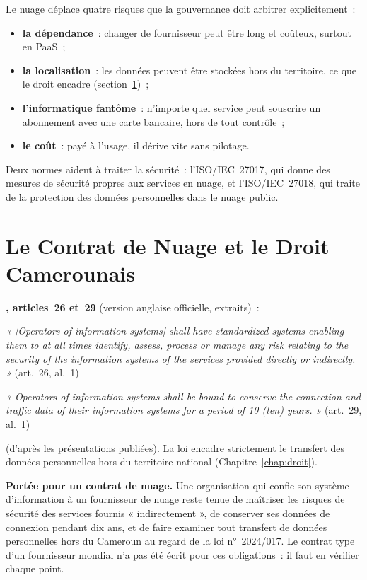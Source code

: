 Le nuage déplace quatre risques que la gouvernance doit arbitrer
explicitement~:
\begin{itemize}
    \item \textbf{la dépendance}~: changer de fournisseur peut être long et
          coûteux, surtout en PaaS~;
    \item \textbf{la localisation}~: les données peuvent être stockées
          hors du territoire, ce que le droit encadre
          (section~\ref{sec:c18-contrat})~;
    \item \textbf{l'informatique fantôme}~: n'importe quel service peut
          souscrire un abonnement avec une carte bancaire, hors de tout
          contrôle~;
    \item \textbf{le coût}~: payé à l'usage, il dérive vite sans pilotage.
\end{itemize}
Deux normes aident à traiter la sécurité~: l'ISO/IEC~27017, qui donne des
mesures de sécurité propres aux services en nuage, et l'ISO/IEC~27018, qui
traite de la protection des données personnelles dans le nuage public.

\section{Le Contrat de Nuage et le Droit Camerounais}
\label{sec:c18-contrat}

\begin{boxjuris}
\textbf{, articles~26 et~29} (version anglaise
officielle, extraits)~:

\medskip
\textit{« [Operators of information systems] shall have standardized
systems enabling them to at all times identify, assess, process or manage
any risk relating to the security of the information systems of the
services provided directly or indirectly. »} (art.~26, al.~1)

\medskip
\textit{« Operators of information systems shall be bound to conserve the
connection and traffic data of their information systems for a period of
10 (ten) years. »} (art.~29, al.~1)

\medskip
\textbf{} (d'après les présentations publiées). La loi
encadre strictement le transfert des données personnelles hors du
territoire national (Chapitre~\ref{chap:droit}).

\medskip
\textbf{Portée pour un contrat de nuage.} Une organisation qui confie son
système d'information à un fournisseur de nuage reste tenue de maîtriser
les risques de sécurité des services fournis « indirectement », de
conserver ses données de connexion pendant dix ans, et de faire examiner
tout transfert de données personnelles hors du Cameroun au regard de la
loi n°~2024/017. Le contrat type d'un fournisseur mondial n'a pas été
écrit pour ces obligations~: il faut en vérifier chaque point.
\end{boxjuris}

